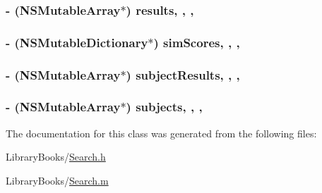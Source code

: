 \subsubsection[{results}]{\setlength{\rightskip}{0pt plus 5cm}-\/ (N\+S\+Mutable\+Array$\ast$) results\hspace{0.3cm}{\ttfamily [read]}, {\ttfamily [write]}, {\ttfamily [atomic]}, {\ttfamily [strong]}}\label{interface_search_a0668886a14e92186615ff6bc00411271}
\hypertarget{interface_search_a7263d296cac4a23ef4ece7cbfd95aa35}{}
\subsubsection[{sim\+Scores}]{\setlength{\rightskip}{0pt plus 5cm}-\/ (N\+S\+Mutable\+Dictionary$\ast$) sim\+Scores\hspace{0.3cm}{\ttfamily [read]}, {\ttfamily [write]}, {\ttfamily [atomic]}, {\ttfamily [strong]}}\label{interface_search_a7263d296cac4a23ef4ece7cbfd95aa35}
\hypertarget{interface_search_ad219c19b30b84d04cbbd8a5c78a13139}{}
\subsubsection[{subject\+Results}]{\setlength{\rightskip}{0pt plus 5cm}-\/ (N\+S\+Mutable\+Array$\ast$) subject\+Results\hspace{0.3cm}{\ttfamily [read]}, {\ttfamily [write]}, {\ttfamily [atomic]}, {\ttfamily [strong]}}\label{interface_search_ad219c19b30b84d04cbbd8a5c78a13139}
\hypertarget{interface_search_a5b0dd445df4f4e86e71b15f53a609083}{}
\subsubsection[{subjects}]{\setlength{\rightskip}{0pt plus 5cm}-\/ (N\+S\+Mutable\+Array$\ast$) subjects\hspace{0.3cm}{\ttfamily [read]}, {\ttfamily [write]}, {\ttfamily [atomic]}, {\ttfamily [strong]}}\label{interface_search_a5b0dd445df4f4e86e71b15f53a609083}


The documentation for this class was generated from the following files\+:\begin{DoxyCompactItemize}
\item 
Library\+Books/\hyperlink{_search_8h}{Search.\+h}\item 
Library\+Books/\hyperlink{_search_8m}{Search.\+m}\end{DoxyCompactItemize}
